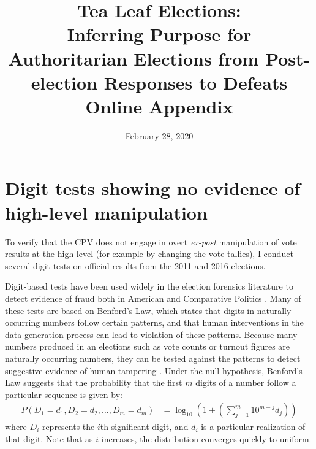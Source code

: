 \documentclass[12pt]{article}
\title{Tea Leaf Elections: \\
	Inferring Purpose for Authoritarian Elections from Post-election Responses to Defeats \\
	\vspace{2ex}
	Online Appendix}
\date{February 28, 2020}
\newcommand{\1}{\mathbbm{1}}
\renewcommand\r{\right}
\renewcommand\l{\left}
\begin{document}
	

\maketitle
\thispagestyle{empty}


\doublespacing

\newpage
{}

\tableofcontents
\newpage

\appendix

\section{Digit tests showing no evidence of high-level manipulation}
\label{app:benford}
To verify that the CPV does not engage in overt \textit{ex-post} manipulation of vote results at the high level (for example by changing the vote tallies), I conduct several digit tests on official results from the 2011 and 2016 elections. 

Digit-based tests have been used widely in the election forensics literature to detect evidence of fraud both in American \citep{Mebane2006} and Comparative Politics \citep{Mebane2009, Beber2012}. Many of these tests are based on Benford's Law, which states that digits in naturally occurring numbers follow certain patterns, and that human interventions in the data generation process can lead to violation of these patterns. Because many numbers produced in an elections such as vote counts or turnout figures are naturally occurring numbers, they can be tested against the patterns to detect suggestive evidence of human tampering \citep{Mebane2006}. Under the null hypothesis, Benford's Law suggests that the probability that the first $m$ digits of a number follow a particular sequence is given by:
\begin{align*}
P(D_1=d_1, D_2=d_2, \dots, D_m=d_m) &= \log_{10}\l(1 + \l( \sum_{j=1}^{m}10^{m-j}d_j\r)\r)
\end{align*}
where $D_i$ represents the $i$th significant digit, and $d_i$ is a particular realization of that digit. 
Note that as $i$ increases, the distribution converges quickly to uniform.
\end{document}

